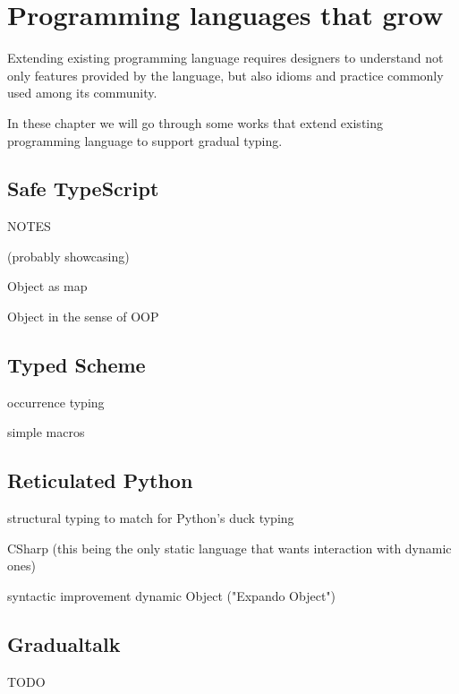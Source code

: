 
\renewcommand{\thechapter}{2}

\chapter{Programming languages that grow}

Extending existing programming language requires designers to understand not only features
provided by the language, but also idioms and practice commonly used among its community.

In these chapter we will go through some works that extend existing programming
language to support gradual typing.

\section{Safe TypeScript}


NOTES

(probably showcasing)

Object as map

Object in the sense of OOP



\section{Typed Scheme}

occurrence typing

simple macros

\section{Reticulated Python}

structural typing to match for Python's duck typing

CSharp (this being the only static language that wants interaction with dynamic ones)

syntactic improvement
dynamic Object ("Expando Object")

\section{Gradualtalk}

TODO